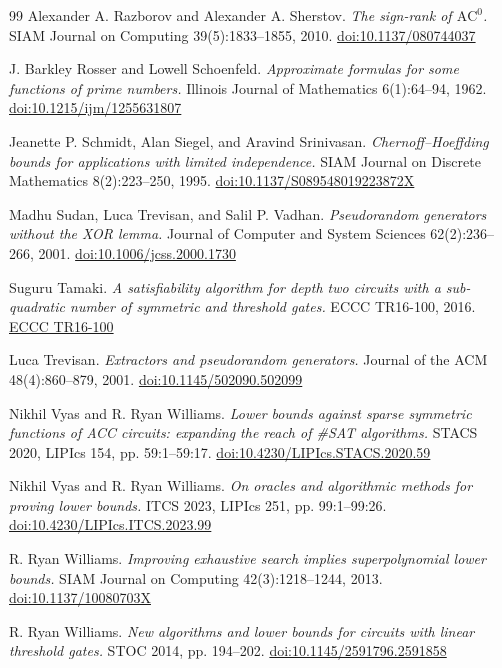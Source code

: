 \documentclass[11pt,letterpaper]{article}
\theoremstyle{definition}
\theoremstyle{remark}
\begin{document}
\begin{thebibliography}{99}
 Alexander A. Razborov and Alexander A. Sherstov. \emph{The
sign-rank of \(\mathrm{AC}^0\).} SIAM Journal on Computing
39(5):1833--1855, 2010.
\href{https://doi.org/10.1137/080744037}{doi:10.1137/080744037}

 J. Barkley Rosser and Lowell Schoenfeld. \emph{Approximate
formulas for some functions of prime numbers.} Illinois Journal of
Mathematics 6(1):64--94, 1962.
\href{https://doi.org/10.1215/ijm/1255631807}{doi:10.1215/ijm/1255631807}

 Jeanette P. Schmidt, Alan Siegel, and Aravind Srinivasan.
\emph{Chernoff--Hoeffding bounds for applications with limited
independence.} SIAM Journal on Discrete Mathematics 8(2):223--250,
1995.
\href{https://doi.org/10.1137/S089548019223872X}{doi:10.1137/S089548019223872X}

 Madhu Sudan, Luca Trevisan, and Salil P. Vadhan.
\emph{Pseudorandom generators without the XOR lemma.} Journal of
Computer and System Sciences 62(2):236--266, 2001.
\href{https://doi.org/10.1006/jcss.2000.1730}{doi:10.1006/jcss.2000.1730}

 Suguru Tamaki. \emph{A satisfiability algorithm for depth
two circuits with a sub-quadratic number of symmetric and threshold
gates.} ECCC TR16-100, 2016.
\href{https://eccc.weizmann.ac.il/report/2016/100/}{ECCC TR16-100}

 Luca Trevisan. \emph{Extractors and pseudorandom
generators.} Journal of the ACM 48(4):860--879, 2001.
\href{https://doi.org/10.1145/502090.502099}{doi:10.1145/502090.502099}

 Nikhil Vyas and R. Ryan Williams. \emph{Lower bounds against
sparse symmetric functions of ACC circuits: expanding the reach of
\#SAT algorithms.} STACS 2020, LIPIcs 154, pp. 59:1--59:17.
\href{https://doi.org/10.4230/LIPIcs.STACS.2020.59}{doi:10.4230/LIPIcs.STACS.2020.59}

 Nikhil Vyas and R. Ryan Williams. \emph{On oracles and
algorithmic methods for proving lower bounds.} ITCS 2023, LIPIcs 251,
pp. 99:1--99:26.
\href{https://doi.org/10.4230/LIPIcs.ITCS.2023.99}{doi:10.4230/LIPIcs.ITCS.2023.99}

 R. Ryan Williams. \emph{Improving exhaustive search implies
superpolynomial lower bounds.} SIAM Journal on Computing
42(3):1218--1244, 2013.
\href{https://doi.org/10.1137/10080703X}{doi:10.1137/10080703X}

 R. Ryan Williams. \emph{New algorithms and lower bounds for
circuits with linear threshold gates.} STOC 2014, pp. 194--202.
\href{https://doi.org/10.1145/2591796.2591858}{doi:10.1145/2591796.2591858}


\end{thebibliography}
\end{document}

